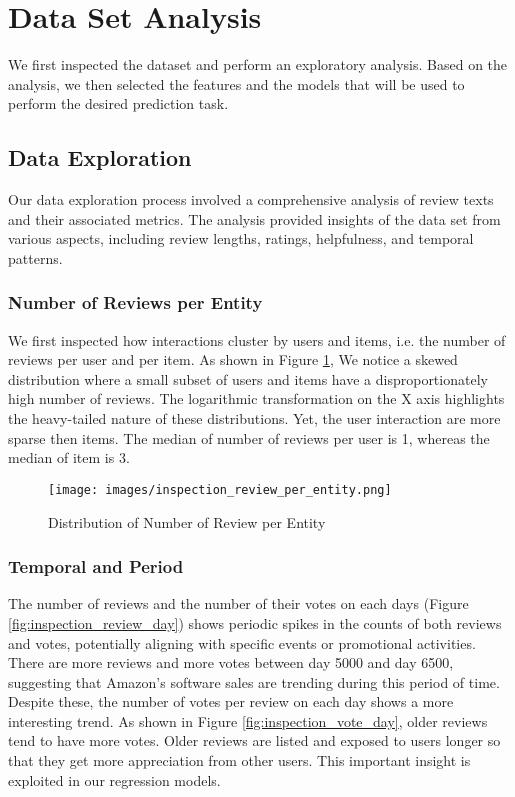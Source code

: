 \documentclass[final]{cvpr}
\begin{document}
\section{Data Set Analysis}

We first inspected the dataset and perform an exploratory analysis. Based on the analysis, we then selected the features and the models that will be used to perform the desired prediction task.

\subsection{Data Exploration}
Our data exploration process involved a comprehensive analysis of review texts and their associated metrics. The analysis provided insights of the data set from various aspects, including review lengths, ratings, helpfulness, and temporal patterns.

\subsubsection{Number of Reviews per Entity}
We first inspected how interactions cluster by users and items, i.e. the number of reviews per user and per item.
As shown in Figure \ref{fig:inspection_review_per_entity}, We notice a skewed distribution where a small subset of users and items have a disproportionately high number of reviews.
The logarithmic transformation on the X axis highlights the heavy-tailed nature of these distributions. 
Yet, the user interaction are more sparse then items. The median of number of reviews per user is 1, whereas the median of item is 3.

\begin{figure}[h]
\texttt{[image: images/inspection\_review\_per\_entity.png]}
\caption{Distribution of Number of Review per Entity}
\label{fig:inspection_review_per_entity}
\end{figure}

\subsubsection{Temporal and Period}
\label{sec:temporal_and_period}
The number of reviews and the number of their votes on each days (Figure \ref{fig:inspection_review_day}) shows periodic spikes in the counts of both reviews and votes, potentially aligning with specific events or promotional activities. There are more reviews and more votes between day 5000 and day 6500, suggesting that Amazon's software sales are trending during this period of time. 
Despite these, the number of votes per review on each day shows a more interesting trend. As shown in Figure \ref{fig:inspection_vote_day}, older reviews tend to have more votes.
Older reviews are listed and exposed to users longer so that they get more appreciation from other users. This important insight is exploited in our regression models.
\end{document}
